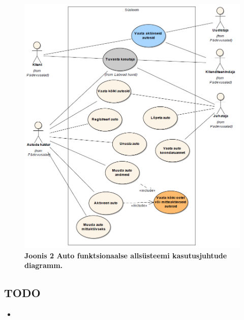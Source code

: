 \documentclass{report}
\begin{document}
\begin{figure}[H]
	\includegraphics[scale=0.6]{joonis2}
	\caption{\textbf{Joonis 2 Auto funktsionaalse allsüsteemi kasutusjuhtude diagramm.}}
\end{figure}

\subsection{TODO}
\begin{itemize}
	\item 
\end{itemize}
\end{document}
